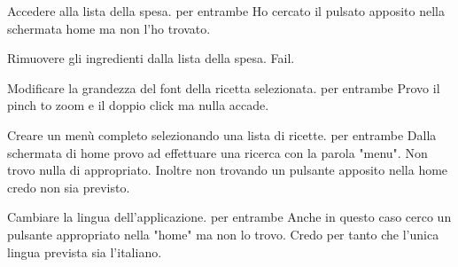 \item Accedere alla lista della spesa.
per entrambe
Ho cercato il pulsato apposito nella schermata home ma non l'ho trovato.

\item Rimuovere gli ingredienti dalla lista della spesa.
Fail.

\item Modificare la grandezza del font della ricetta selezionata.
per entrambe
Provo il pinch to zoom e il doppio click ma nulla accade.

\item Creare un menù completo selezionando una lista di ricette.
per entrambe
Dalla schermata di home provo ad effettuare una ricerca con la parola
"menu". Non trovo nulla di appropriato. Inoltre non trovando un pulsante
apposito
nella home credo non sia previsto. 

\item Cambiare la lingua dell'applicazione.
per entrambe
Anche in questo caso cerco un pulsante appropriato nella "home" ma non
lo trovo. Credo per tanto che l'unica lingua prevista sia l'italiano.

